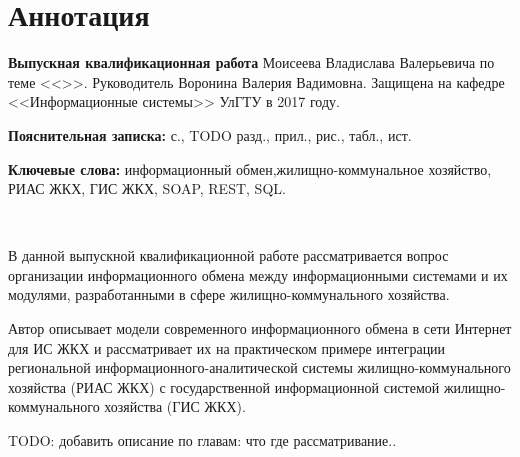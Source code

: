 
\section*{Аннотация}

\textbf{Выпускная квалификационная работа} Моисеева Владислава Валерьевича по теме <<\WorkName>>.
Руководитель Воронина Валерия Вадимовна.
Защищена на кафедре <<Информационные системы>> УлГТУ в 2017 году.

\textbf{Пояснительная записка:}  с.,  TODO разд.,  прил.,  рис.,  табл.,  ист.

\textbf{Ключевые слова:} информационный обмен,\linebreak жилищно-коммунальное хозяйство, РИАС ЖКХ, ГИС ЖКХ, SOAP, REST, SQL.

~

В данной выпускной квалификационной работе рассматривается вопрос организации информационного обмена между информационными системами и их модулями, разработанными в сфере жилищно-коммунального хозяйства.

Автор описывает модели современного информационного обмена в сети Интернет для ИС ЖКХ и рассматривает их на практическом примере интеграции региональной информационного-аналитической системы жилищно-коммунального хозяйства (РИАС ЖКХ) с государственной информационной системой жилищно-коммунального хозяйства (ГИС ЖКХ).

TODO: добавить описание по главам: что где рассматривание..

\newpage
\listoffigures

\clearpage
\newpage